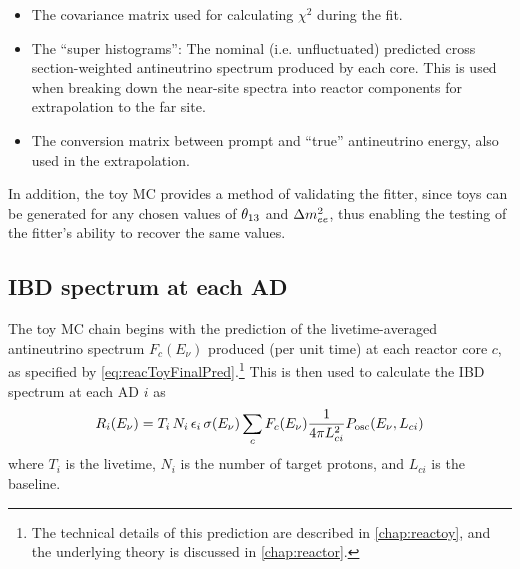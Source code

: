\documentclass[../thesis.tex]{subfiles}
\begin{document}
\begin{itemize}
\item The covariance matrix used for calculating $\chi^2$ during the fit.
\item The ``super histograms'': The nominal (i.e. unfluctuated) predicted cross
  section-weighted antineutrino spectrum produced by each core. This is used
  when breaking down the near-site spectra into reactor components for
  extrapolation to the far site.
\item The conversion matrix between prompt and ``true'' antineutrino energy,
  also used in the extrapolation.
\end{itemize}

In addition, the toy MC provides a method of validating the fitter, since toys
can be generated for any chosen values of $\theta_{13}$ and $\Delta m^2_{ee}$, thus enabling
the testing of the fitter's ability to recover the same values.

\begin{comment}
  The toy MC also generates a ``PredictedIBD'' file which contains the bac
  kground-free no-oscillation IBD spectra of each detector. As far as I can
  tell, this is only used in order to calculate a `summed' covariance matrix in
  which the matrices of the three stages (6, 8, 7AD) are combined, with the
  weighting determined by the PredictedIBD counts. (Oscillations shouldn't
  affect this weighting between ADs in the same hall, or the weighting between
  different stages.) In turn, the summed matrix is not used during the fit, but
  is only produced as a diagnostic.
\end{comment}

\subsection{IBD spectrum at each AD}
\label{sec:fitToyFluxPred}

The toy MC chain begins with the prediction of the livetime-averaged
antineutrino spectrum $F_c(E_\nu)$ produced (per unit time) at each reactor core
$c$, as specified by \autoref{eq:reacToyFinalPred}.\footnote{The technical
  details of this prediction are described in \autoref{chap:reactoy}, and the
  underlying theory is discussed in \autoref{chap:reactor}.} This is then used
to calculate the IBD spectrum at each AD $i$ as
\begin{equation}
  \label{eq:fitTrueIbdSpec}
  R_i(E_\nu) = T_i\,N_i\,\epsilon_i\,\sigma(E_\nu) \sum_c F_c(E_\nu) \frac{1}{4\pi L_{ci}^2}
  P_\mathrm{osc}(E_\nu, L_{ci})
\end{equation}
where $T_i$ is the livetime, $N_i$ is the number of target protons, and $L_{ci}$
is the baseline.
\end{document}
